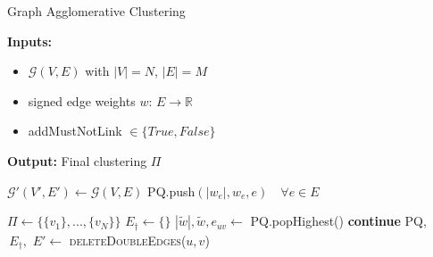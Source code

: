 \documentclass[10pt,twocolumn,letterpaper]{article}
\begin{document}
\begin{algorithm}
  \caption{Graph Agglomerative Clustering}
\setlength{\parindent}{\algorithmicindent} \textbf{Inputs:}
     \begin{itemize}[leftmargin=1.3cm,topsep=0.1pt,itemsep=-1.ex]
   \item $\mathcal{G}(V,E)$ with $|V|=N$, $|E|=M$
   \item signed edge weights $w:\,E\rightarrow\mathbb{R}$
   \item {\color{blue}addMustNotLink} $\in \{ True, False\}$
   \end{itemize}
   \vspace{0.4em}
   
\setlength{\parindent}{\algorithmicindent} \textbf{Output:} Final clustering $\Pi$


  \hspace*{\algorithmicindent} 
  \begin{algorithmic}[1]


      \State $\mathcal{G}'(V', E') \gets \mathcal{G}(V, E)$  
        \State PQ.push$(|w_e|, w_e, e) \quad \forall e \in E $  
      
      \State $\Pi \gets \{ \{v_1\}, ..., \{v_N\} \}$ 
      \State $E_\dagger \gets \{\}$ 
    \State
        \State $|\tilde{w}|, \tilde{w}, e_{uv} \gets $ PQ.popHighest()
            \State \textbf{continue}
        \EndIf
          \State PQ, $\,E_\dagger,\,\, E' \gets$ \textsc{deleteDoubleEdges}($u,v$)
          

\end{algorithmic}
\end{algorithm}
\end{document}
